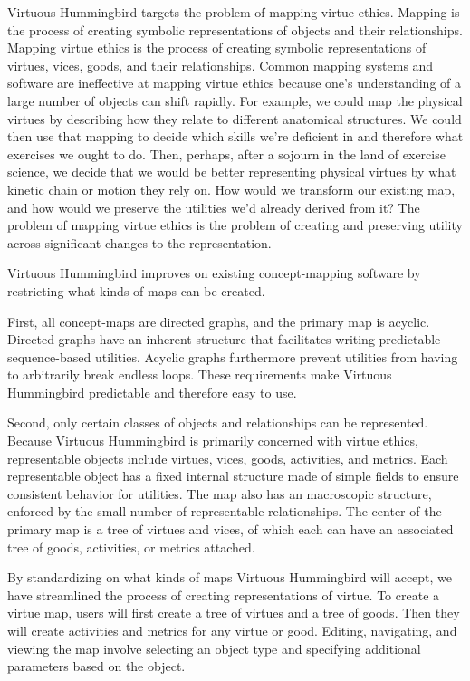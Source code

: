 \documentclass{article}
\newcommand{\name}{Virtuous Hummingbird}
\begin{document}
\name{} targets the problem of mapping virtue ethics.
Mapping is the process of creating symbolic representations of objects and their relationships.
Mapping virtue ethics is the process of creating symbolic representations of virtues, vices, goods, and their relationships.
Common mapping systems and software are ineffective at mapping virtue ethics because one's understanding of a large number of objects can shift rapidly.
For example, we could map the physical virtues by describing how they relate to different anatomical structures.
We could then use that mapping to decide which skills we're deficient in and therefore what exercises we ought to do.
Then, perhaps, after a sojourn in the land of exercise science, we decide that we would be better representing physical virtues by what kinetic chain or motion they rely on.
How would we transform our existing map, and how would we preserve the utilities we'd already derived from it?
The problem of mapping virtue ethics is the problem of creating and preserving utility across significant changes to the representation.

\name{} improves on existing concept-mapping software by restricting what kinds of maps can be created.

First, all concept-maps are directed graphs, and the primary map is acyclic.
Directed graphs have an inherent structure that facilitates writing predictable sequence-based utilities.
Acyclic graphs furthermore prevent utilities from having to arbitrarily break endless loops.
These requirements make \name{} predictable and therefore easy to use.

Second, only certain classes of objects and relationships can be represented.
Because \name{} is primarily concerned with virtue ethics, representable objects include virtues, vices, goods, activities, and metrics.
Each representable object has a fixed internal structure made of simple fields to ensure consistent behavior for utilities.
The map also has an macroscopic structure, enforced by the small number of representable relationships.
The center of the primary map is a tree of virtues and vices, of which each can have an associated tree of goods, activities, or metrics attached.

By standardizing on what kinds of maps \name{} will accept, we have streamlined the process of creating representations of virtue.
To create a virtue map, users will first create a tree of virtues and a tree of goods.
Then they will create activities and metrics for any virtue or good.
Editing, navigating, and viewing the map involve selecting an object type and specifying additional parameters based on the object.
\end{document}
